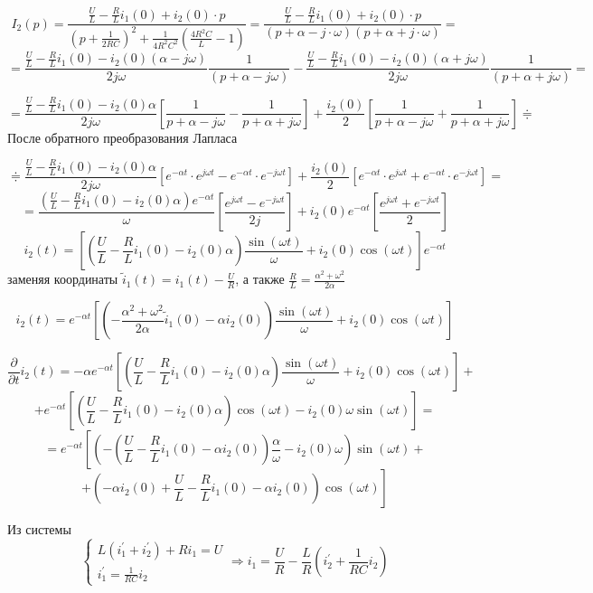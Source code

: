 \documentclass[a4paper,12pt]{article}
\begin{document}
$$
I_2(p) = \frac{\frac{U}{L}- \frac{R}{L}i_1(0) + i_2(0)\cdot p}
{\left(p + \frac{1}{2RC}\right)^2 + \frac{1}{4R^2C^2}\left(\frac{4R^2C}{L} - 1\right)}=
\frac{\frac{U}{L}- \frac{R}{L}i_1(0) + i_2(0)\cdot p}{(p + \alpha - j\cdot\omega)(p+\alpha+j\cdot\omega)} =
$$
$$
=\frac{\frac{U}{L}-\frac{R}{L} i_1(0) - i_2(0)(\alpha-j\omega)}{2j\omega}
\frac{1}{(p + \alpha - j\omega)} -
\frac{\frac{U}{L}-\frac{R}{L} i_1(0) - i_2(0)(\alpha + j\omega)}{2j\omega}
\frac{1}{(p + \alpha + j\omega)}=
$$

$$
=\frac{\frac{U}{L}-\frac{R}{L} i_1(0) - i_2(0)\alpha}{2j\omega}
\left[\frac{1}{p+\alpha-j\omega} - \frac{1}{p+\alpha+j\omega} \right] + 
\frac{i_2(0)}{2}\left[\frac{1}{p+\alpha-j\omega} + \frac{1}{p+\alpha+j\omega} \right]
\doteqdot
$$
После обратного преобразования Лапласа

$$
\doteqdot
\frac{\frac{U}{L}-\frac{R}{L} i_1(0) - i_2(0)\alpha}{2j\omega}
\left[e^{-\alpha t}\cdot e^{j\omega t} - e^{-\alpha t}\cdot e^{-j\omega t}\right]
+\frac{i_2(0)}{2}\left[e^{-\alpha t}\cdot e^{j\omega t} + e^{-\alpha t}\cdot e^{-j\omega t}\right] =
$$
$$
= \frac{\left(\frac{U}{L}-\frac{R}{L} i_1(0) - i_2(0)\alpha\right)e^{-\alpha t}}{\omega} 
\left[\frac{e^{j\omega t} -  e^{-j \omega t}}{2j}\right] 
+ i_2(0) e^{-\alpha t} \left[\frac{e^{j\omega t} +  e^{-j \omega t}}{2}\right]
$$
$$
i_2(t) = \left[ \left(\frac{U}{L}-\frac{R}{L} i_1(0) - i_2(0)\alpha\right)\frac{\sin(\omega t)}{\omega}
+ i_2(0)\cos(\omega t) \right] e^{-\alpha t}
$$
заменяя координаты ${\displaystyle \tilde{i}_1(t) = i_1(t) - \frac{U}{R}}$, 
а также ${\displaystyle \frac{R}{L} = \frac{\alpha^2+\omega^2}{2\alpha}}$

$$
i_2(t) = e^{-\alpha t}\left[ \left(-\frac{\alpha^2+\omega^2}{2\alpha} \tilde{i}_1(0) - \alpha i_2(0)\right) 
\frac{\sin(\omega t)}{\omega} + i_2(0)\cos(\omega t)\right]
$$


$$
\frac{\partial}{\partial t}i_2(t) = -\alpha e^{-\alpha t}
\left[ \left(\frac{U}{L}-\frac{R}{L} i_1(0) - i_2(0)\alpha\right)\frac{\sin(\omega t)}{\omega}
+ i_2(0)\cos(\omega t) \right] +
$$
$$
+e^{-\alpha t} \left[\left(\frac{U}{L}-\frac{R}{L} i_1(0) - i_2(0)\alpha\right)\cos(\omega t) 
- i_2(0)\omega \sin(\omega t)\right] =
$$
$$
= e^{-\alpha t} \left[\left(-\left(\frac{U}{L} - \frac{R}{L}i_1(0) - \alpha i_2(0)\right) 
\frac{\alpha}{\omega} - i_2(0)\omega\right)\sin(\omega t)\right. +
$$
$$
+\left.\left(-\alpha i_2(0) + \frac{U}{L} - \frac{R}{L}i_1(0) - \alpha i_2(0) \right)\cos(\omega t)
\right]
$$

Из системы 
$$
\left\{
\begin{array}{lcl}
	L(i_1^\prime + i_2^\prime) + Ri_1 = U\\[1.5mm]
	i_1^\prime = \frac{1}{RC} i_2
\end{array}\right. \Rightarrow
i_1 = \frac{U}{R} - \frac{L}{R}\left(i_2^\prime + \frac{1}{RC}i_2\right)
$$
\end{document}
